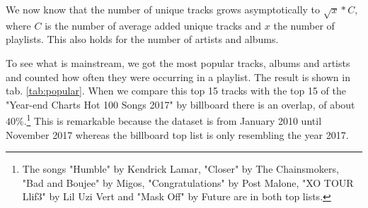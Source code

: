 We now know that the number of unique tracks grows asymptotically to $\sqrt{x}*C$, where $C$ is the number of average added unique tracks and $x$ the number of playlists. This also holds for the number of artists and albums. 

To see what is mainstream, we got the most popular tracks, albums and artists and counted how often they were occurring in a playlist. The result is shown in tab. \ref{tab:popular}. When we compare this top 15 tracks with the top 15 of the "Year-end Charts Hot 100 Songs 2017" by billboard there is an overlap, of about $40 \%$.\footnote{The songs "Humble" by Kendrick Lamar, "Closer" by The Chainsmokers, "Bad and Boujee" by Migos, "Congratulations" by Post Malone, "XO TOUR Llif3" by Lil Uzi Vert and "Mask Off" by Future are in both top lists.}\citep{BillboardMedia} This is remarkable because the dataset is from January 2010 until November 2017 whereas the billboard top list is only resembling the year 2017.

